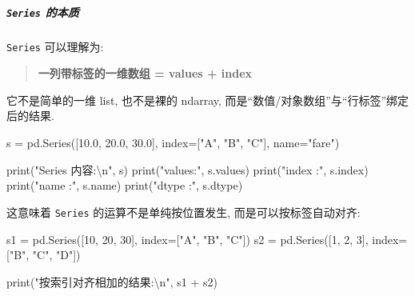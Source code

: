 \documentclass[11pt]{article}
\newenvironment{Shaded}{}{}
\newcommand{\DecValTok}[1]{\textcolor[rgb]{0.25,0.63,0.44}{{#1}}}
\newcommand{\FloatTok}[1]{\textcolor[rgb]{0.25,0.63,0.44}{{#1}}}
\newcommand{\CharTok}[1]{\textcolor[rgb]{0.25,0.44,0.63}{{#1}}}
\newcommand{\StringTok}[1]{\textcolor[rgb]{0.25,0.44,0.63}{{#1}}}
\newcommand{\NormalTok}[1]{{#1}}
\newcommand{\OperatorTok}[1]{\textcolor[rgb]{0.40,0.40,0.40}{{#1}}}
\newcommand{\BuiltInTok}[1]{{#1}}
\begin{document}
    \subparagraph{\texorpdfstring{\texttt{Series}
的本质}{Series 的本质}}\label{series-ux7684ux672cux8d28}

    \texttt{Series} 可以理解为:

\begin{quote}
\textbf{一列带标签的一维数组 = values + index}
\end{quote}

它不是简单的一维 list, 也不是裸的 ndarray,
而是``数值/对象数组''与``行标签''绑定后的结果.

\begin{Shaded}
\begin{Highlighting}[]
\NormalTok{s }\OperatorTok{=}\NormalTok{ pd.Series([}\FloatTok{10.0}\NormalTok{, }\FloatTok{20.0}\NormalTok{, }\FloatTok{30.0}\NormalTok{], index}\OperatorTok{=}\NormalTok{[}\StringTok{"A"}\NormalTok{, }\StringTok{"B"}\NormalTok{, }\StringTok{"C"}\NormalTok{], name}\OperatorTok{=}\StringTok{"fare"}\NormalTok{)}

\BuiltInTok{print}\NormalTok{(}\StringTok{"Series 内容:}\CharTok{\textbackslash{}n}\StringTok{"}\NormalTok{, s)}
\BuiltInTok{print}\NormalTok{(}\StringTok{"values:"}\NormalTok{, s.values)}
\BuiltInTok{print}\NormalTok{(}\StringTok{"index :"}\NormalTok{, s.index)}
\BuiltInTok{print}\NormalTok{(}\StringTok{"name  :"}\NormalTok{, s.name)}
\BuiltInTok{print}\NormalTok{(}\StringTok{"dtype :"}\NormalTok{, s.dtype)}
\end{Highlighting}
\end{Shaded}

这意味着 \texttt{Series} 的运算不是单纯按位置发生,
而是可以按标签自动对齐:

\begin{Shaded}
\begin{Highlighting}[]
\NormalTok{s1 }\OperatorTok{=}\NormalTok{ pd.Series([}\DecValTok{10}\NormalTok{, }\DecValTok{20}\NormalTok{, }\DecValTok{30}\NormalTok{], index}\OperatorTok{=}\NormalTok{[}\StringTok{"A"}\NormalTok{, }\StringTok{"B"}\NormalTok{, }\StringTok{"C"}\NormalTok{])}
\NormalTok{s2 }\OperatorTok{=}\NormalTok{ pd.Series([}\DecValTok{1}\NormalTok{, }\DecValTok{2}\NormalTok{, }\DecValTok{3}\NormalTok{], index}\OperatorTok{=}\NormalTok{[}\StringTok{"B"}\NormalTok{, }\StringTok{"C"}\NormalTok{, }\StringTok{"D"}\NormalTok{])}

\BuiltInTok{print}\NormalTok{(}\StringTok{"按索引对齐相加的结果:}\CharTok{\textbackslash{}n}\StringTok{"}\NormalTok{, s1 }\OperatorTok{+}\NormalTok{ s2)}
\end{Highlighting}
\end{Shaded}
\end{document}
